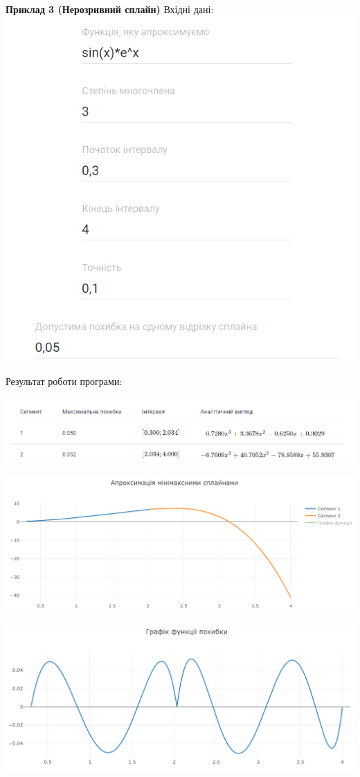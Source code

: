 \documentclass[ukrainian,14pt]{extarticle}
\begin{document}
\textbf{Приклад 3 (Нерозривний сплайн)}
Вхідні дані:
\vspace{0.5cm}
\\
\includegraphics[scale=0.7]{example_4_inputs}

\vspace{0.5cm}

Результат роботи програми:

\vspace{0.5cm}
\includegraphics[scale=0.6]{example_4_table}

\includegraphics[scale=0.55]{example4}

\vspace{1cm}

\includegraphics[scale=0.5]{example_4_error} 
\end{document}
